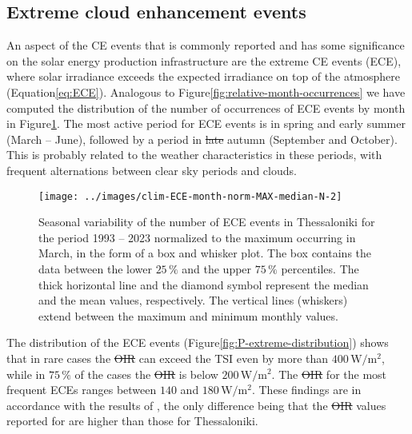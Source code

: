 \documentclass[preprint, 5p,
authoryear]{elsarticle} %
\providecommand{\DIFaddtex}[1]{{\protect\color{blue}\uwave{#1}}} %
\providecommand{\DIFdeltex}[1]{{\protect\color{red}\sout{#1}}}                      %
\providecommand{\DIFaddbegin}{} %
\providecommand{\DIFaddend}{} %
\providecommand{\DIFdelbegin}{} %
\providecommand{\DIFdelend}{} %
\providecommand{\DIFadd}[1]{\texorpdfstring{\DIFaddtex{#1}}{#1}} %
\providecommand{\DIFdel}[1]{\texorpdfstring{\DIFdeltex{#1}}{}} %
\newcommand{\DIFscaledelfig}{0.5}
\newlength{\DIFdelgraphicswidth} %
\newlength{\DIFdelgraphicsheight} %
\newcommand{\DIFaddincludegraphics}[2][]{{\color{blue}\fbox{\DIFOincludegraphics[#1]{#2}}}} %
\newcommand{\DIFdelincludegraphics}[2][]{%
\sbox{\DIFdelgraphicsbox}{\DIFOincludegraphics[#1]{#2}}%
\settoboxwidth{\DIFdelgraphicswidth}{\DIFdelgraphicsbox} %
\settoboxtotalheight{\DIFdelgraphicsheight}{\DIFdelgraphicsbox} %
\scalebox{\DIFscaledelfig}{%
\parbox[b]{\DIFdelgraphicswidth}{\usebox{\DIFdelgraphicsbox}\\[-\baselineskip] \rule{\DIFdelgraphicswidth}{0em}}\llap{\resizebox{\DIFdelgraphicswidth}{\DIFdelgraphicsheight}{%
\setlength{\unitlength}{\DIFdelgraphicswidth}%
\begin{picture}(1,1)%
\thicklines\linethickness{2pt} %
{\color[rgb]{1,0,0}\put(0,0){\framebox(1,1){}}}%
{\color[rgb]{1,0,0}\put(0,0){\line( 1,1){1}}}%
{\color[rgb]{1,0,0}\put(0,1){\line(1,-1){1}}}%
\end{picture}%
}\hspace*{3pt}}} %
} %
\DeclareRobustCommand{\DIFaddbegin}{\DIFOaddbegin \let\includegraphics\DIFaddincludegraphics} %
\DeclareRobustCommand{\DIFaddend}{\DIFOaddend \let\includegraphics\DIFOincludegraphics} %
\DeclareRobustCommand{\DIFdelbegin}{\DIFOdelbegin \let\includegraphics\DIFdelincludegraphics} %
\DeclareRobustCommand{\DIFdelend}{\DIFOaddend \let\includegraphics\DIFOincludegraphics} %
\begin{document}
\hypertarget{extreme-cloud-enhancement-events}{%
\subsection{Extreme cloud enhancement
events}\label{extreme-cloud-enhancement-events}}

An aspect of the CE events that is commonly reported and has some
significance on the solar energy production infrastructure are the
extreme CE events (ECE), where solar irradiance exceeds the expected
irradiance on top of the atmosphere \DIFaddbegin \DIFadd{at the same SZA
}\DIFaddend (Equation\nobreakspace{}\ref{eq:ECE}). Analogous to
Figure\nobreakspace{}\ref{fig:relative-month-occurrences} we have
computed the distribution of the number of occurrences of ECE events by
month in Figure\nobreakspace{}\ref{fig:relative-month-occurancies-ECE}.
The most active period for ECE events is in spring and early summer
(March -- June), followed by a period in \DIFdelbegin \DIFdel{late }\DIFdelend \DIFaddbegin \DIFadd{early }\DIFaddend autumn (September and
October). This is probably related to the weather characteristics in
these periods, with frequent alternations between clear sky periods and
clouds.

\begin{figure}

{\centering \texttt{[image: ../images/clim-ECE-month-norm-MAX-median-N-2]} 

}

\caption{Seasonal variability of the number of ECE events in Thessaloniki for the period 1993 -- 2023 normalized to the maximum occurring in March, in the form of a box and whisker plot. The box contains the data between the lower $25\,\%$ and the upper $75\,\%$ percentiles. The thick horizontal line and the diamond symbol represent the median and the mean values, respectively. The vertical lines (whiskers) extend between the maximum and minimum monthly values.}\label{fig:relative-month-occurancies-ECE}
\end{figure}

The distribution of the ECE events
(Figure\nobreakspace{}\ref{fig:P-extreme-distribution}) shows that in
rare cases the \DIFdelbegin \DIFdel{OIR }\DIFdelend \DIFaddbegin \DIFadd{OI }\DIFaddend can exceed the TSI even by more than
\(400\,\text{W}/\text{m}^2\), while in \(75\,\%\) of the cases the \DIFdelbegin \DIFdel{OIR
}\DIFdelend \DIFaddbegin \DIFadd{OI }\DIFaddend is
below \(200\,\text{W}/\text{m}^2\). The \DIFdelbegin \DIFdel{OIR }\DIFdelend \DIFaddbegin \DIFadd{OI }\DIFaddend for the most frequent ECEs
ranges between \(140\) and \(180\,\text{W}/\text{m}^2\). These findings
are in accordance with the results of \citet{Vamvakas2020}, the only
difference being that the \DIFdelbegin \DIFdel{OIR }\DIFdelend \DIFaddbegin \DIFadd{OI }\DIFaddend values reported for are higher than those
for Thessaloniki.
\end{document}

